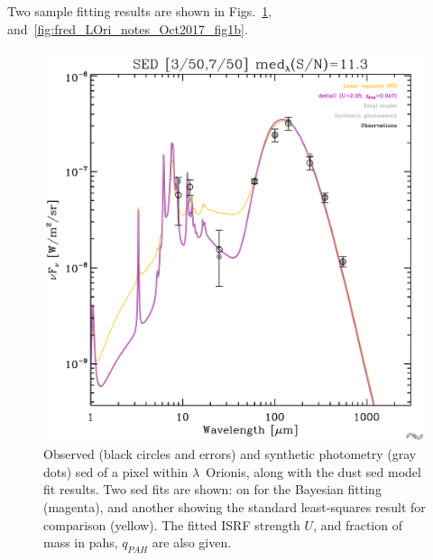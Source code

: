          Two sample fitting results are shown in Figs.~\ref{fig:fred_LOri_notes_Oct2017_fig1a}, and~\ref{fig:fred_LOri_notes_Oct2017_fig1b}.
              \begin{figure}
                \includegraphics[width=\textwidth]{../Plots/ch_lori/fred_LOri_notes_Oct2017_fig1a.pdf}
                \centering
                \caption{Observed (black circles and errors) and synthetic photometry (gray dots) \acrshort{sed} of a pixel within $\lambda$~Orionis, along with the dust \acrshort{sed} model fit results. Two \acrshort{sed} fits are shown: on for the Bayesian fitting (magenta), and another showing the standard least-squares result for comparison (yellow). The fitted ISRF strength $U$, and fraction of mass in \acrshort{pah}s, $q_{PAH}$ are also given.}
                \label{fig:fred_LOri_notes_Oct2017_fig1a}
              \end{figure}
